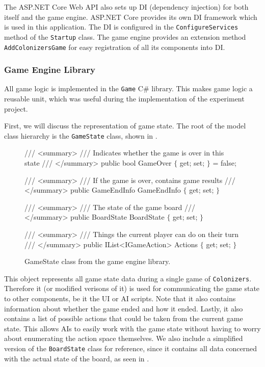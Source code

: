 The ASP.NET Core Web API also sets up DI (dependency injection) for both itself and
the game engine. ASP.NET Core provides its own DI framework
which is used in this application. The DI is configured in the
\texttt{ConfigureServices} method of the \texttt{Startup} class.
The game engine provides an extension method \texttt{AddColonizersGame}
for easy registration of all its components into DI.

\subsubsection{Game Engine Library}

All game logic is implemented in the \texttt{Game} C\# library. This
makes game logic a reusable unit, which was useful during the implementation of
the experiment project.

First, we will discuss the representation of game state. The root
of the model class hierarchy is the \texttt{GameState} class, shown in .

\begin{figure}[ht]
\begin{code}[commandchars=\\\{\},codes={\catcode`\$=3\catcode`\^=7\catcode`\_=8}]
/// <summary>
/// Indicates whether the game is over in this state
/// </summary>
public bool GameOver $\{$ get; set; $\}$ = false;

/// <summary>
/// If the game is over, contains game results
/// </summary>
public GameEndInfo GameEndInfo $\{$ get; set; $\}$

/// <summary>
/// The state of the game board
/// </summary>
public BoardState BoardState $\{$ get; set; $\}$

/// <summary>
/// Things the current player can do on their turn
/// </summary>
public IList<IGameAction> Actions $\{$ get; set; $\}$
\end{code}
\caption{GameState class from the game engine library.}\label{dd:gamestate}
\end{figure}

This object represents all game state data during a single game of \texttt{Colonizers}.
Therefore it (or modified verisons of it) is used for communicating the game state
to other components, be it the UI or AI scripts. Note that it also contains information
about whether the game ended and how it ended. Lastly, it also contains a list of possible
actions that could be taken from the current game state. This allows AIs to easily
work with the game state without having to worry about enumerating the action
space themselves. We also include a simplified version of the \texttt{BoardState} class
for reference,
since it contains all data concerned with the actual state of the board, as seen
in .

